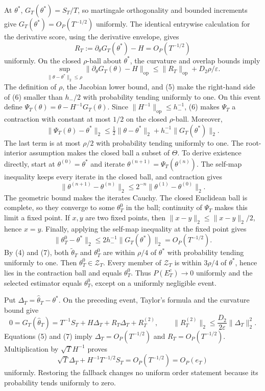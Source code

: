 At \(\theta^*\), \(G_T(\theta^*)=S_T/T\), so martingale orthogonality and bounded increments give \(G_T(\theta^*)=O_P(T^{-1/2})\) uniformly. The identical entrywise calculation for the derivative score, using the derivative envelope, gives
\[
 R_T:=\partial_\theta G_T(\theta^*)-H=O_P(T^{-1/2})
\tag{5}
\]
uniformly. On the closed \(\rho\)-ball about \(\theta^*\), the curvature and overlap bounds imply
\[
 \sup_{\|\theta-\theta^*\|_2\le\rho}
 \|\partial_\theta G_T(\theta)-H\|_{\mathrm{op}}
 \le\|R_T\|_{\mathrm{op}}+D_2\rho/\varepsilon.
\tag{6}
\]
The definition of \(\rho\), the Jacobian lower bound, and (5) make the right-hand side of (6) smaller than \(h_-/2\) with probability tending uniformly to one. On this event define \(\Psi_T(\theta)=\theta-H^{-1}G_T(\theta)\). Since \(\|H^{-1}\|_{\mathrm{op}}\le h_-^{-1}\), (6) makes \(\Psi_T\) a contraction with constant at most \(1/2\) on the closed \(\rho\)-ball. Moreover,
\[
 \|\Psi_T(\theta)-\theta^*\|_2
 \le\tfrac12\|\theta-\theta^*\|_2+h_-^{-1}\|G_T(\theta^*)\|_2.
\]
The last term is at most \(\rho/2\) with probability tending uniformly to one. The root-interior assumption makes the closed ball a subset of \(\Theta\). To derive existence directly, start at \(\theta^{(0)}=\theta^*\) and iterate \(\theta^{(n+1)}=\Psi_T(\theta^{(n)})\). The self-map inequality keeps every iterate in the closed ball, and contraction gives
\[
 \|\theta^{(n+1)}-\theta^{(n)}\|_2
 \le 2^{-n}\|\theta^{(1)}-\theta^{(0)}\|_2.
\]
The geometric bound makes the iterates Cauchy. The closed Euclidean ball is complete, so they converge to some \(\theta_T^0\) in the ball; continuity of \(\Psi_T\) makes this limit a fixed point. If \(x,y\) are two fixed points, then \(\|x-y\|_2\le\|x-y\|_2/2\), hence \(x=y\). Finally, applying the self-map inequality at the fixed point gives
\[
 \|\theta_T^0-\theta^*\|_2
 \le2h_-^{-1}\|G_T(\theta^*)\|_2=O_P(T^{-1/2}).
\tag{7}
\]
By (4) and (7), both \(\widetilde\theta_T\) and \(\theta_T^0\) are within \(\rho/4\) of \(\theta^*\) with probability tending uniformly to one. Then \(\theta_T^0\in\mathcal Z_T\). Every member of \(\mathcal Z_T\) is within \(3\rho/4\) of \(\theta^*\), hence lies in the contraction ball and equals \(\theta_T^0\). Thus \(P(E_T^c)\to0\) uniformly and the selected estimator equals \(\theta_T^0\), except on a uniformly negligible event.

Put \(\Delta_T=\widehat\theta_T-\theta^*\). On the preceding event, Taylor's formula and the curvature bound give
\[
 0=G_T(\widehat\theta_T)
 =T^{-1}S_T+H\Delta_T+R_T\Delta_T+R_T^{(2)},
 \qquad
 \|R_T^{(2)}\|_2\le\frac{D_2}{2\varepsilon}\|\Delta_T\|_2^2.
\]
Equations (5) and (7) imply \(\Delta_T=O_P(T^{-1/2})\) and \(R_T=O_P(T^{-1/2})\). Multiplication by \(\sqrt T H^{-1}\) proves
\[
 \sqrt T\Delta_T+H^{-1}T^{-1/2}S_T
 =O_P(T^{-1/2})=O_P(e_T)
\tag{8}
\]
uniformly. Restoring the fallback changes no uniform order statement because its probability tends uniformly to zero.

